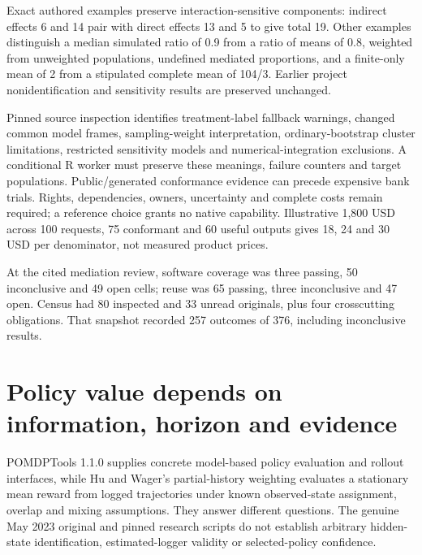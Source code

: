 Exact authored examples preserve interaction-sensitive components:
indirect effects 6 and 14 pair with direct effects 13 and 5 to give
total 19. Other examples distinguish a median simulated ratio of 0.9
from a ratio of means of 0.8, weighted from unweighted populations,
undefined mediated proportions, and a finite-only mean of 2 from a
stipulated complete mean of 104/3. Earlier project nonidentification and
sensitivity results are preserved unchanged.
\citep{exec24_mediation_contract,exec20_med_reference}

Pinned source inspection identifies treatment-label fallback warnings,
changed common model frames, sampling-weight interpretation,
ordinary-bootstrap cluster limitations, restricted sensitivity models
and numerical-integration exclusions. A conditional R worker must
preserve these meanings, failure counters and target populations.
Public/generated conformance evidence can precede expensive bank trials.
Rights, dependencies, owners, uncertainty and complete costs remain
required; a reference choice grants no native capability. Illustrative
1,800 USD across 100 requests, 75 conformant and 60 useful outputs gives
18, 24 and 30 USD per denominator, not measured product prices.
\citep{exec24_mediation_sources,exec24_mediation_contract}

At the cited mediation review, software coverage was three passing, 50
inconclusive and 49 open cells; reuse was 65 passing, three inconclusive
and 47 open. Census had 80 inspected and 33 unread originals, plus four
crosscutting obligations. That snapshot recorded 257 outcomes of 376,
including inconclusive results.
\citep{sp24medreuse_reader,sp24medreuse_progress}

\hypertarget{policy-value-depends-on-information-horizon-and-evidence}{%
\section{Policy value depends on information, horizon and
evidence}\label{policy-value-depends-on-information-horizon-and-evidence}}

POMDPTools 1.1.0 supplies concrete model-based policy evaluation and
rollout interfaces, while Hu and Wager's partial-history weighting
evaluates a stationary mean reward from logged trajectories under known
observed-state assignment, overlap and mixing assumptions. They answer
different questions. The genuine May 2023 original and pinned research
scripts do not establish arbitrary hidden-state identification,
estimated-logger validity or selected-policy confidence.
\citep{exec24_policyother_tools,exec24_policyother_original,exec24_policyother_ope}

